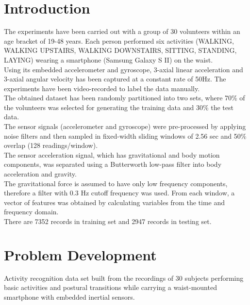 \documentclass[12pt,a4paper]{report}
\begin{document}
	\section{Introduction}
	The experiments have been carried out with a group of 30 volunteers within an age bracket of 19-48 years. Each person performed six activities (WALKING, WALKING UPSTAIRS, WALKING DOWNSTAIRS, SITTING, STANDING, LAYING) wearing a smartphone (Samsung Galaxy S II) on the waist.  \cite{first}\\
	
	 Using its embedded accelerometer and gyroscope, 3-axial linear acceleration and 3-axial angular velocity has been captured at a constant rate of 50Hz. The experiments have been video-recorded to label the data manually.\\
	 
	  The obtained dataset has been randomly partitioned into two sets, where 70\% of the volunteers was selected for generating the training data and 30\% the test data. \\
	
	The sensor signals (accelerometer and gyroscope) were pre-processed by applying noise filters and then sampled in fixed-width sliding windows of 2.56 sec and 50\% overlap (128 readings/window).\\
	 The sensor acceleration signal, which has gravitational and body motion components, was separated using a Butterworth low-pass filter into body acceleration and gravity.\\
	 
	  The gravitational force is assumed to have only low frequency components, therefore a filter with 0.3 Hz cutoff frequency was used. From each window, a vector of features was obtained by calculating variables from the time and frequency domain.\\
	  
	There are 7352 records in training set and 2947 records in testing set.\\ 
	
	
	\newpage
	
	\section{Problem Development}
	Activity recognition data set built from the recordings of 30 subjects performing basic activities and postural transitions while carrying a waist-mounted smartphone with embedded inertial sensors.                              \cite{second}
\end{document}
